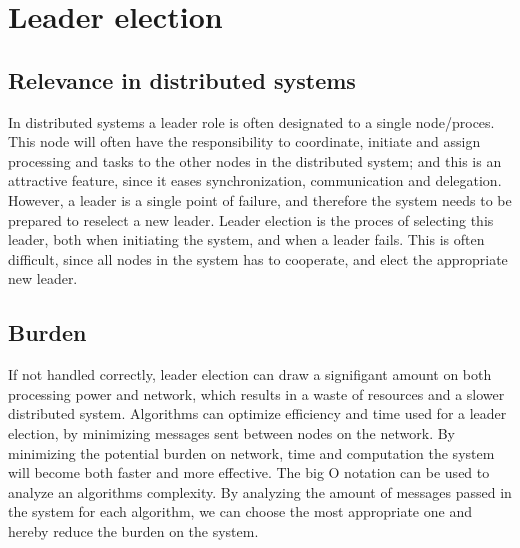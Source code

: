 \section{Leader election}
\subsection{Relevance in distributed systems}
In distributed systems a leader role is often designated to a single node/proces. This node will often have the responsibility to coordinate, initiate and assign processing and tasks to the other nodes in the distributed system; and this is an attractive feature, since it eases synchronization, communication and delegation.
However, a leader is a single point of failure, and therefore the system needs to be prepared to reselect a new leader.
Leader election is the proces of selecting this leader, both when initiating the system, and when a leader fails.
This is often difficult, since all nodes in the system has to cooperate, and elect the appropriate new leader.

\subsection{Burden}
If not handled correctly, leader election can draw a signifigant amount on both processing power and network, which results in a waste of resources and a slower distributed system. Algorithms can optimize efficiency and time used for a leader election, by minimizing messages sent between nodes on the network.
By minimizing the potential burden on network, time and computation the system will become both faster and more effective.
The big O notation can be used to analyze an algorithms complexity. By analyzing the amount of messages passed in the system for each algorithm, we can choose the most appropriate one and hereby reduce the burden on the system.
